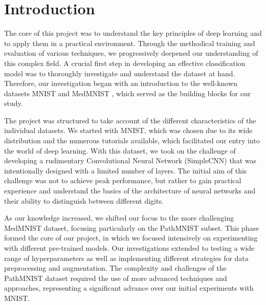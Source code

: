 \section{Introduction}\label{intro}

The core of this project was to understand the key principles of deep learning and to apply them in a practical environment. Through the methodical training and evaluation of various techniques, we progressively deepened our understanding of this complex field. A crucial first step in developing an effective classification model was to thoroughly investigate and understand the dataset at hand. Therefore, our investigation began with an introduction to the well-known datasets MNIST \citep{deng2012mnist} and MedMNIST \citep{medmnistv1}, which served as the building blocks for our study.

The project was structured to take account of the different characteristics of the individual datasets. We started with MNIST, which was chosen due to its wide distribution and the numerous tutorials available, which facilitated our entry into the world of deep learning. With this dataset, we took on the challenge of developing a rudimentary Convolutional Neural Network (SimpleCNN) that was intentionally designed with a limited number of layers. The initial aim of this challenge was not to achieve peak performance, but rather to gain practical experience and understand the basics of the architecture of neural networks and their ability to distinguish between different digits.

As our knowledge increased, we shifted our focus to the more challenging MedMNIST dataset, focusing particularly on the PathMNIST subset. This phase formed the core of our project, in which we focused intensively on experimenting with different pre-trained models. Our investigations extended to testing a wide range of hyperparameters as well as implementing different strategies for data preprocessing and augmentation. The complexity and challenges of the PathMNIST dataset required the use of more advanced techniques and approaches, representing a significant advance over our initial experiments with MNIST.\@


